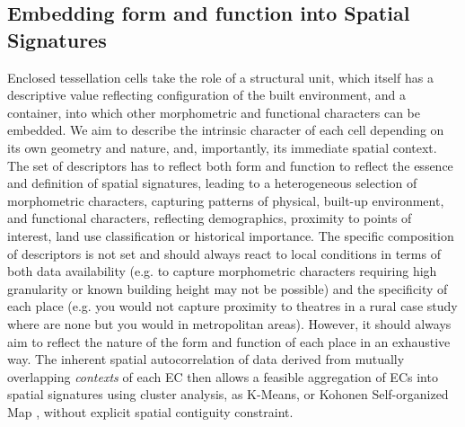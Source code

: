 \subsection{Embedding form and function into Spatial Signatures}
\label{ssec:ss_ff}

Enclosed tessellation cells take the role of a structural unit, which itself has a
descriptive value reflecting configuration of the built environment, and a
container, into which other morphometric and functional characters can be
embedded.
We aim to describe the intrinsic character of each cell depending on its own
geometry and nature, and, importantly, its immediate spatial context.
The set of descriptors has to reflect both form and function to reflect the
essence and definition of spatial signatures, leading to a heterogeneous
selection of morphometric characters, capturing patterns of physical, built-up
environment, and functional characters, reflecting demographics, proximity to
points of interest, land use classification or historical importance.
The specific composition of descriptors is not set and should always react to
local conditions in terms of both data availability (e.g. to capture morphometric characters
requiring high granularity or known building height may not be possible) and
the specificity of each place (e.g. you would not capture proximity to theatres in
a rural case study where are none but you would in metropolitan areas). However,
it should always aim to reflect the nature of the form and function of each
place in an exhaustive way.
The inherent spatial autocorrelation of data derived from mutually overlapping
\textit{contexts} of each EC then allows a feasible aggregation of ECs into
spatial signatures using cluster analysis, as K-Means, or Kohonen Self-organized
Map \citep{kohonen1990self}, without explicit spatial contiguity constraint.
